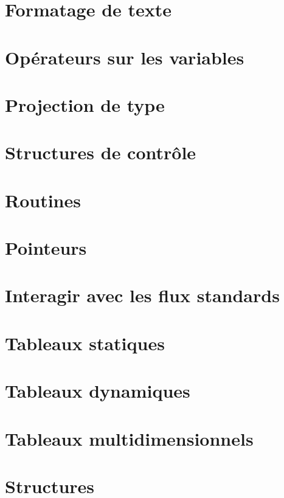 \documentclass{minitelreport}
\begin{document}
\begin{refsection}
		\section{Formatage de texte}
		
		\section{Opérateurs sur les variables}
		
		\section{Projection de type}
		
		\section{Structures de contrôle}
		
		\section{Routines}
		
		\section{Pointeurs}
		
		\section{Interagir avec les flux standards}
		
		\section{Tableaux statiques}
		
		\section{Tableaux dynamiques}
		
		\section{Tableaux multidimensionnels}
		
		\section{Structures}
		

\end{refsection}
\end{document}
